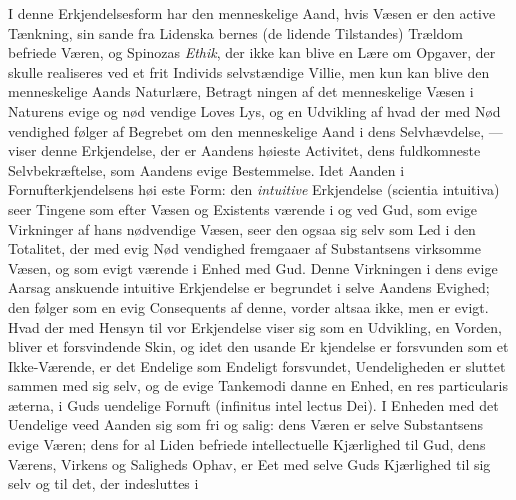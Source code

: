 \documentclass[12pt,a4paper]{book}
\begin{document}
I denne Erkjendelsesform har den menneskelige Aand,
hvis Væsen er den active Tænkning, sin sande fra Lidenska\-%
bernes (de lidende Tilstandes) Trældom befriede Væren, og
Spinozas \emph{Ethik}, der ikke kan blive en Lære om Opgaver, der
skulle realiseres ved et frit Individs selvstændige Villie, men
kun kan blive den menneskelige Aands Naturlære, Betragt\-%
ningen af det menneskelige Væsen i Naturens evige og nød\-%
vendige Loves Lys, og en Udvikling af hvad der med Nød\-%
vendighed følger af Begrebet om den menneskelige Aand i
dens Selvhævdelse, --- viser denne Erkjendelse, der er Aandens
høieste Activitet, dens fuldkomneste Selvbekræftelse, som Aandens
evige Bestemmelse. Idet Aanden i Fornufterkjendelsens høi\-%
este Form: den \emph{intuitive} Erkjendelse (scientia intuitiva) seer
Tingene som efter Væsen og Existents værende i og ved Gud,
som evige Virkninger af hans nødvendige Væsen, seer den
ogsaa sig selv som Led i den Totalitet, der med evig Nød\-%
vendighed fremgaaer af Substantsens virksomme Væsen, og
som evigt værende i Enhed med Gud. Denne Virkningen i
dens evige Aarsag anskuende intuitive Erkjendelse er begrundet
i selve Aandens Evighed; den følger som en evig Consequents
af denne, vorder altsaa ikke, men er evigt. Hvad der med
Hensyn til vor Erkjendelse viser sig som en Udvikling, en
Vorden, bliver et forsvindende Skin, og idet den usande Er\-%
kjendelse er forsvunden som et Ikke-Værende, er det Endelige
som Endeligt forsvundet, Uendeligheden er sluttet sammen
med sig selv, og de evige Tankemodi danne en Enhed, en res
particularis æterna, i Guds uendelige Fornuft (infinitus intel\-%
lectus Dei). I Enheden med det Uendelige veed Aanden sig
som fri og salig: dens Væren er selve Substantsens evige
Væren; dens for al Liden befriede intellectuelle Kjærlighed til
Gud, dens Værens, Virkens og Saligheds Ophav, er Eet med
selve Guds Kjærlighed til sig selv og til det, der indesluttes i
\end{document}
